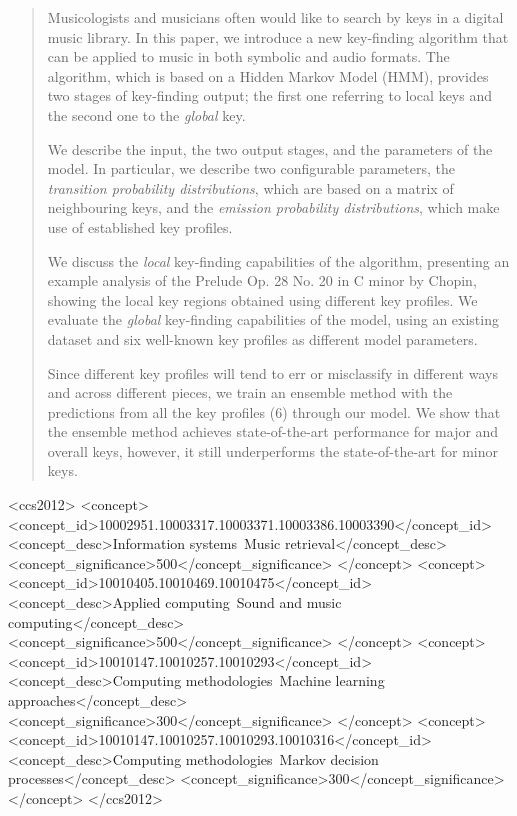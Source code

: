 \documentclass[sigconf]{acmart}
\begin{document}
\begin{abstract}
Musicologists and musicians often would like to search by keys in a digital music library. In this paper, we introduce a new key-finding algorithm that can be applied to music in both symbolic and audio formats. The algorithm, which is based on a Hidden Markov Model (HMM), provides two stages of key-finding output; the first one referring to local keys and the second one to the \emph{global} key.

We describe the input, the two output stages, and the parameters of the model. In particular, we describe two configurable parameters, the \emph{transition probability distributions}, which are based on a matrix of neighbouring keys, and the \emph{emission probability distributions}, which make use of established key profiles.

We discuss the \emph{local} key-finding capabilities of the algorithm, presenting an example analysis of the Prelude Op. 28 No. 20 in C minor by Chopin, showing the local key regions obtained using different key profiles. We evaluate the \emph{global} key-finding capabilities of the model, using an existing dataset and six well-known key profiles as different model parameters.

Since different key profiles will tend to err or misclassify in different ways and across different pieces, we train an ensemble method with the predictions from all the key profiles (6) through our model. We show that the ensemble method achieves state-of-the-art performance for major and overall keys, however, it still underperforms the state-of-the-art for minor keys.
\end{abstract}

\begin{CCSXML}
<ccs2012>
<concept>
<concept_id>10002951.10003317.10003371.10003386.10003390</concept_id>
<concept_desc>Information systems~Music retrieval</concept_desc>
<concept_significance>500</concept_significance>
</concept>
<concept>
<concept_id>10010405.10010469.10010475</concept_id>
<concept_desc>Applied computing~Sound and music computing</concept_desc>
<concept_significance>500</concept_significance>
</concept>
<concept>
<concept_id>10010147.10010257.10010293</concept_id>
<concept_desc>Computing methodologies~Machine learning approaches</concept_desc>
<concept_significance>300</concept_significance>
</concept>
<concept>
<concept_id>10010147.10010257.10010293.10010316</concept_id>
<concept_desc>Computing methodologies~Markov decision processes</concept_desc>
<concept_significance>300</concept_significance>
</concept>
</ccs2012>
\end{CCSXML}
\end{document}
